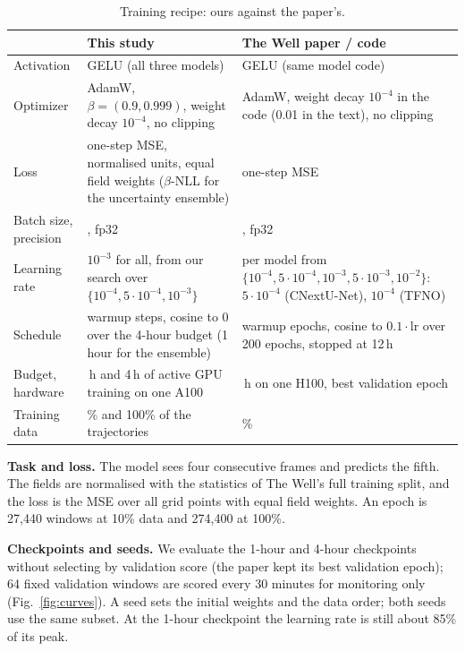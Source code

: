\documentclass[11pt]{article}
\begin{document}
\begin{table}[!htbp]
\centering\footnotesize
\begin{tabularx}{\linewidth}{@{}>{\raggedright\arraybackslash}p{2.0cm}>{\raggedright\arraybackslash}X>{\raggedright\arraybackslash}X@{}}
\toprule
& This study & The Well paper / code \\
\midrule
Activation & GELU (all three models) & GELU (same model code) \\
Optimizer & AdamW, $\beta = (0.9, 0.999)$, weight decay $10^{-4}$, no clipping & AdamW, weight decay $10^{-4}$ in the code (0.01 in the text), no clipping \\
Loss & one-step MSE, normalised units, equal field weights ($\beta$-NLL for the uncertainty ensemble) & one-step MSE \\
Batch size, precision & 64, fp32 & 64, fp32 \\
Learning rate & $10^{-3}$ for all, from our search over $\{10^{-4}, 5\cdot10^{-4}, 10^{-3}\}$ & per model from $\{10^{-4}, 5\cdot10^{-4}, 10^{-3}, 5\cdot10^{-3}, 10^{-2}\}$: $5\cdot10^{-4}$ (CNextU-Net), $10^{-4}$ (TFNO) \\
Schedule & 500 warmup steps, cosine to 0 over the 4-hour budget (1 hour for the ensemble) & 5 warmup epochs, cosine to $0.1\cdot$lr over 200 epochs, stopped at 12\,h \\
Budget, hardware & 1\,h and 4\,h of active GPU training on one A100 & 12\,h on one H100, best validation epoch \\
Training data & 10\% and 100\% of the trajectories & 100\% \\
\bottomrule
\end{tabularx}
\caption{Training recipe: ours against the paper's.}
\label{tab:recipe}
\end{table}

\textbf{Task and loss.} The model sees four consecutive frames and predicts the fifth. The fields are normalised
with the statistics of The Well's full training split, and the loss is the MSE over all grid points with equal
field weights. An epoch is 27,440 windows at 10\% data and 274,400 at 100\%.

\textbf{Checkpoints and seeds.} We evaluate the 1-hour and 4-hour checkpoints without selecting by validation score
(the paper kept its best validation epoch); 64 fixed validation windows are scored every 30 minutes for monitoring
only (Fig.~\ref{fig:curves}). A seed sets the initial weights and the data order; both seeds use the same subset. At
the 1-hour checkpoint the learning rate is still about 85\% of its peak.
\end{document}
